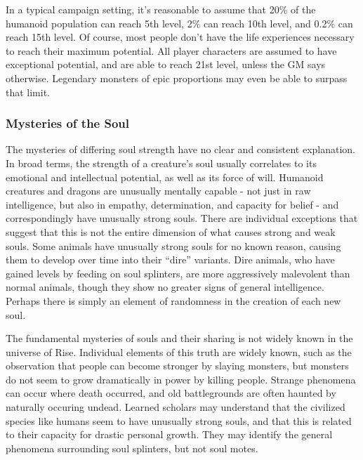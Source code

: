       In a typical campaign setting, it's reasonable to assume that 20\% of the humanoid population can reach 5th level, 2\% can reach 10th level, and 0.2\% can reach 15th level.
      Of course, most people don't have the life experiences necessary to reach their maximum potential.
      All player characters are assumed to have exceptional potential, and are able to reach 21st level, unless the GM says otherwise.
      Legendary monsters of epic proportions may even be able to surpass that limit.

    \subsubsection{Mysteries of the Soul}
      The mysteries of differing soul strength have no clear and consistent explanation.
      In broad terms, the strength of a creature's soul usually correlates to its emotional and intellectual potential, as well as its force of will.
      Humanoid creatures and dragons are unusually mentally capable - not just in raw intelligence, but also in empathy, determination, and capacity for belief - and correspondingly have unusually strong souls.
      There are individual exceptions that suggest that this is not the entire dimension of what causes strong and weak souls.
      Some animals have unusually strong souls for no known reason, causing them to develop over time into their ``dire'' variants.
      Dire animals, who have gained levels by feeding on soul splinters, are more aggressively malevolent than normal animals, though they show no greater signs of general intelligence.
      Perhaps there is simply an element of randomness in the creation of each new soul.

      The fundamental mysteries of souls and their sharing is not widely known in the universe of Rise.
      Individual elements of this truth are widely known, such as the observation that people can become stronger by slaying monsters, but monsters do not seem to grow dramatically in power by killing people.
      Strange phenomena can occur where death occurred, and old battlegrounds are often haunted by naturally occuring undead.
      Learned scholars may understand that the civilized species like humans seem to have unusually strong souls, and that this is related to their capacity for drastic personal growth.
      They may identify the general phenomena surrounding soul splinters, but not soul motes.

